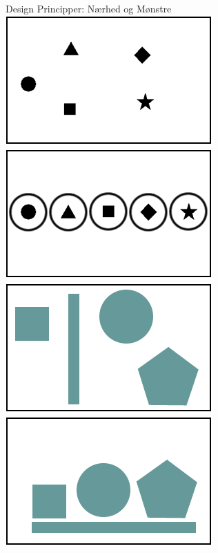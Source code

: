 \documentclass[10pt]{beamer}
\begin{document}
\begin{frame}{Design Principper: Nærhed og Mønstre}
\centering
	\includegraphics[width=.45\linewidth]{img/norepetitionexample.png}\quad%
	\includegraphics[width=.45\linewidth]{img/repetitionexample.png}\quad%
	\includegraphics[width=.45\linewidth]{img/noproximityexample.png}\quad%
	\includegraphics[width=.45\linewidth]{img/proximityexample.png}
\end{frame}
\end{document}
